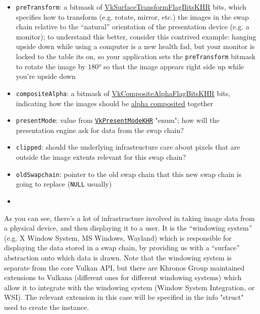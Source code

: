 \documentclass[12pt,letterpaper]{article}
\newcommand{\inquotes}[1]{``#1''}	%
\newcommand{\cil}[1]{\texttt{#1}}
\begin{document}
\begin{itemize}
		\item \cil{preTransform}: a bitmask of \href{http://vulkan-spec-chunked.ahcox.com/ch29s05.html#VkSurfaceTransformFlagBitsKHR}{VkSurfaceTransformFlagBitsKHR} bits, which specifies how to transform (e.g. rotate, mirror, etc.) the images in the swap chain relative to the \inquotes{natural} orientation of the presentation device (e.g. a monitor); to understand this better, consider this contrived example: hanging upside down while using a computer is a new health fad, but your monitor is locked to the table its on, so your application sets the \cil{preTransform} bitmask to rotate the image by $\ang{180}$ so that the image appears right side up while you're upside down
		
		\item \cil{compositeAlpha}: a bitmask of \href{http://vulkan-spec-chunked.ahcox.com/ch29s05.html#VkCompositeAlphaFlagBitsKHR}{VkCompositeAlphaFlagBitsKHR} bits, indicating how the images should be \href{https://en.wikipedia.org/wiki/Alpha_compositing}{alpha composited} together
		
		\item \cil{presentMode}: value from \href{http://vulkan-spec-chunked.ahcox.com/ch29s05.html#VkPresentModeKHR}{\cil{VkPresentModeKHR}} "enum"; how will the presentation engine ask for data from the swap chain?
		
		\item \cil{clipped}: should the underlying infrastructure care about pixels that are outside the image extents relevant for this swap chain?
		
		\item \cil{oldSwapchain}: pointer to the old swap chain that this new swap chain is going to replace (\cil{NULL} usually)
		\item 
	\end{itemize}
	
	As you can see, there's a lot of infrastructure involved in taking image data from a physical device, and then displaying it to a user. It is the \inquotes{windowing system} (e.g. X Window System, MS Windows, Wayland) which is responsible for displaying the data stored in a swap chain, by providing us with a \inquotes{surface} abstraction onto which data is drawn. Note that the windowing system is separate from the core Vulkan API, but there are Khronos Group maintained extensions to Vulkana (different ones for different windowing systems) which allow it to integrate with the windowing system (Window System Integration, or WSI). The relevant extension in this case will be specified in the info "struct" used to create the instance.
	
\end{document}
